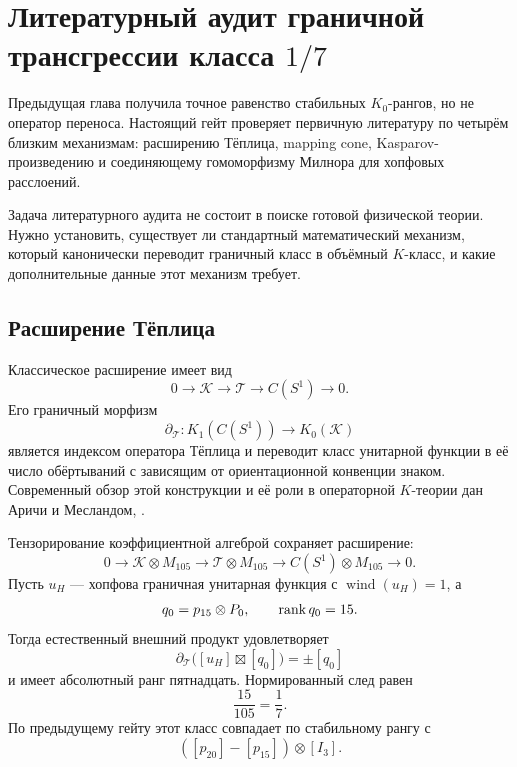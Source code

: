 \chapter{Литературный аудит граничной трансгрессии класса \texorpdfstring{$1/7$}{1/7}}

Предыдущая глава получила точное равенство стабильных $K_0$-рангов, но
не оператор переноса. Настоящий гейт проверяет первичную литературу по
четырём близким механизмам: расширению Тёплица, mapping cone,
Kasparov-произведению и соединяющему гомоморфизму Милнора для хопфовых
расслоений.

Задача литературного аудита не состоит в поиске готовой физической теории.
Нужно установить, существует ли стандартный математический механизм,
который канонически переводит граничный класс в объёмный $K$-класс, и
какие дополнительные данные этот механизм требует.

\section{Расширение Тёплица}

Классическое расширение имеет вид
\begin{equation}
 0\longrightarrow\mathcal K
 \longrightarrow\mathcal T
 \longrightarrow C(S^1)
 \longrightarrow0.
 \label{eq:v5-one-seventh-toeplitz-extension}
\end{equation}
Его граничный морфизм
\begin{equation}
 \partial_{\mathcal T}:K_1(C(S^1))\longrightarrow K_0(\mathcal K)
\end{equation}
является индексом оператора Тёплица и переводит класс унитарной функции в
её число обёртываний с зависящим от ориентационной конвенции знаком.
Современный обзор этой конструкции и её роли в операторной $K$-теории
дан Аричи и Месландом, .

Тензорирование коэффициентной алгеброй сохраняет расширение:
\begin{equation}
 0\longrightarrow\mathcal K\otimes M_{105}
 \longrightarrow\mathcal T\otimes M_{105}
 \longrightarrow C(S^1)\otimes M_{105}
 \longrightarrow0.
 \label{eq:v5-one-seventh-coefficient-toeplitz}
\end{equation}
Пусть $u_H$ --- хопфова граничная унитарная функция с
$\operatorname{wind}(u_H)=1$, а
\begin{equation}
 q_0=p_{15}\otimes P_0,
 \qquad \operatorname{rank} q_0=15.
\end{equation}
Тогда естественный внешний продукт удовлетворяет
\begin{equation}
 \boxed{
 \partial_{\mathcal T}
 \bigl([u_H]\boxtimes[q_0]\bigr)
 =\pm[q_0]
 }
 \label{eq:v5-one-seventh-toeplitz-candidate}
\end{equation}
и имеет абсолютный ранг пятнадцать. Нормированный след равен
\begin{equation}
 \frac{15}{105}=\frac17.
\end{equation}
По предыдущему гейту этот класс совпадает по стабильному рангу с
\begin{equation}
 ([p_{20}]-[p_{15}])\otimes[I_3].
\end{equation}

